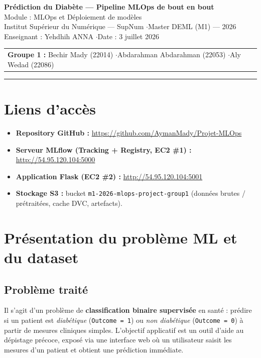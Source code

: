 \documentclass[11pt,a4paper]{article}
\begin{document}
\begin{center}
  {\LARGE\bfseries\color{brand} Prédiction du Diabète --- Pipeline MLOps de bout en bout}\\[4pt]
  {\large Module : MLOps et Déploiement de modèles}\\[2pt]
  {\normalsize Institut Supérieur du Numérique --- SupNum \quad$\cdot$\quad Master DEML (M1) --- 2026}\\[6pt]
  {\normalsize Enseignant : Yehdhih ANNA \quad$\cdot$\quad Date : 3 juillet 2026}\\[8pt]
  \begin{tabular}{l}
    \textbf{Groupe 1 :} Bechir Mady (22014) \quad$\cdot$\quad Abdarahman Abdarahman (22053) \quad$\cdot$\quad Aly Wedad (22086)
  \end{tabular}
\end{center}
\vspace{0.4em}
\hrule
\vspace{0.8em}

\section{Liens d'accès}
\begin{itemize}
  \item \textbf{Repository GitHub :} \url{https://github.com/AymanMady/Projet-MLOps}
  \item \textbf{Serveur MLflow (Tracking + Registry, EC2 \#1) :} \url{http://54.95.120.104:5000}
  \item \textbf{Application Flask (EC2 \#2) :} \url{http://54.95.120.104:5001} \quad{\small\color{ph}}
  \item \textbf{Stockage S3 :} bucket \texttt{m1-2026-mlops-project-group1} (données brutes / prétraitées, cache DVC, artefacts).
\end{itemize}

\section{Présentation du problème ML et du dataset}
\subsection*{Problème traité}
Il s'agit d'un problème de \textbf{classification binaire supervisée} en santé : prédire si un
patient est \emph{diabétique} (\texttt{Outcome = 1}) ou \emph{non diabétique} (\texttt{Outcome = 0})
à partir de mesures cliniques simples. L'objectif applicatif est un outil d'aide au dépistage
précoce, exposé via une interface web où un utilisateur saisit les mesures d'un patient et obtient
une prédiction immédiate.
\end{document}
